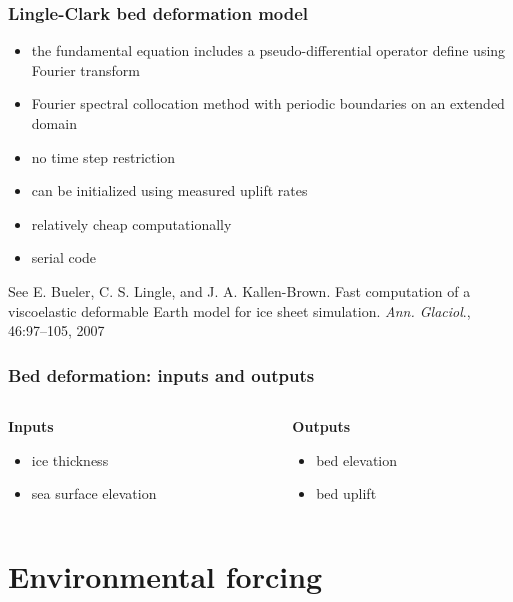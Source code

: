 \documentclass[hide notes,intlimits]{beamer}
\begin{document}
\begin{frame}
  \frametitle{Lingle-Clark bed deformation model}

  \begin{itemize}
  \item the fundamental equation includes a pseudo-differential
    operator define using Fourier transform
  \item Fourier spectral collocation method with periodic boundaries
    on an extended domain
  \item no time step restriction
  \item can be initialized using measured uplift rates
  \item relatively cheap computationally
  \item serial code
  \end{itemize}

  See E. Bueler, C. S. Lingle, and J. A. Kallen-Brown. Fast
  computation of a viscoelastic deformable Earth model for ice sheet
  simulation. \emph{Ann. Glaciol}., 46:97–105, 2007
\end{frame}

\begin{frame}
  \frametitle{Bed deformation: inputs and outputs}

  \begin{columns}[t]
    \begin{column}{0.5\linewidth}
      \textbf{Inputs}

      \begin{itemize}
      \item ice thickness
      \item sea surface elevation
      \end{itemize}
    \end{column}
    \begin{column}{0.5\linewidth}
      \textbf{Outputs}

      \begin{itemize}
      \item bed elevation
      \item bed uplift
      \end{itemize}
    \end{column}
  \end{columns}
\end{frame}

\section{Environmental forcing}
\label{sec:environment}
\end{document}
